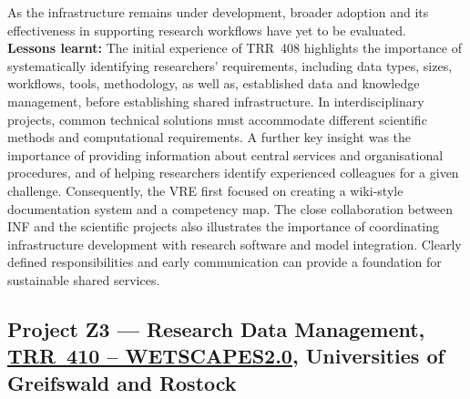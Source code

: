 \documentclass{eceasst}
\begin{document}
As the infrastructure remains under development,
broader adoption and its effectiveness in
supporting research workflows have yet to be
evaluated.
\\
\noindent\textbf{Lessons learnt:}
The initial experience of TRR~408 highlights
the importance of systematically identifying
researchers' requirements, including data types,
sizes, workflows, tools, methodology, as well as,
established data and knowledge management, before establishing
shared infrastructure. In interdisciplinary
projects, common technical solutions must
accommodate different scientific methods and
computational requirements.
A further key insight was the importance of
providing information about central services and
organisational procedures, and of helping
researchers identify experienced colleagues for
a given challenge. Consequently, the VRE first
focused on creating a wiki-style documentation
system and a competency map.
The close collaboration between INF and the
scientific projects also illustrates the
importance of coordinating infrastructure
development with research software and model
integration. Clearly defined responsibilities
and early communication can provide a foundation
for sustainable shared services.


\subsection{Project Z3 --- Research Data Management,
\href{https://wetscapes2.uni-greifswald.de/}{TRR~410 -- WETSCAPES2.0},
Universities of Greifswald and Rostock}
\label{subsec:trr410}
\end{document}

